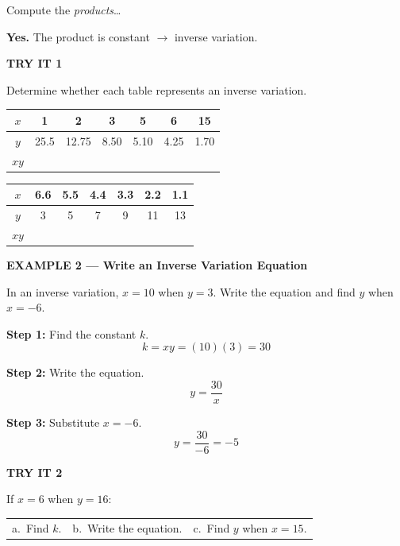 \documentclass[11pt]{article}
\newcommand{\examplehead}[1]{%
  \vspace{0.5em}%
  \noindent\textbf{\large #1}%
  \vspace{0.3em}%
}
\begin{document}
Compute the \textit{products}\ldots

\textbf{Yes.} The product is constant $\rightarrow$ inverse variation.

\examplehead{TRY IT 1}

Determine whether each table represents an inverse variation.

\begin{center}
\renewcommand{\arraystretch}{1.4}
\begin{tabular}{|c|c|c|c|c|c|c|}
  \hline
  $x$  & 1    & 2     & 3    & 5    & 6    & 15   \\ \hline
  $y$  & 25.5 & 12.75 & 8.50 & 5.10 & 4.25 & 1.70 \\ \hline
  $xy$ & & & & & & \\[0.9em] \hline
\end{tabular}
\end{center}

\vspace{0.3em}

\begin{center}
\renewcommand{\arraystretch}{1.4}
\begin{tabular}{|c|c|c|c|c|c|c|}
  \hline
  $x$  & 6.6 & 5.5 & 4.4 & 3.3 & 2.2 & 1.1 \\ \hline
  $y$  & 3   & 5   & 7   & 9   & 11  & 13  \\ \hline
  $xy$ & & & & & & \\[0.9em] \hline
\end{tabular}
\end{center}

\examplehead{\colorbox{highlightyellow}{EXAMPLE 2 --- Write an Inverse Variation Equation}}

In an inverse variation, $x=10$ when $y=3$. Write the equation and find $y$ when $x=-6$.

\textbf{Step 1:} Find the constant $k$.
\[
  k = xy = (10)(3) = 30
\]

\textbf{Step 2:} Write the equation.
\[
  y = \frac{30}{x}
\]

\textbf{Step 3:} Substitute $x=-6$.
\[
  y = \frac{30}{-6} = -5
\]

\examplehead{TRY IT 2}

If $x=6$ when $y=16$:

\begin{center}
\begin{tabular}{@{}p{2.0in}p{2.0in}p{2.0in}@{}}
  a.\ Find $k$. & b.\ Write the equation. & c.\ Find $y$ when $x=15$. \\[1.6in]
\end{tabular}
\end{center}
\end{document}
